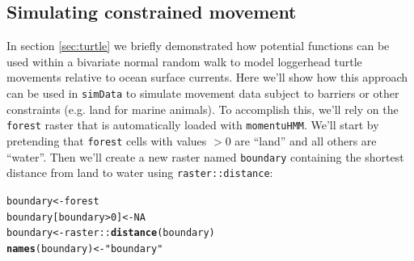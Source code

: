 \documentclass[12pt]{article}\usepackage[]{graphicx}\usepackage[]{xcolor}
\makeatletter
\newcommand{\hlnum}[1]{\textcolor[rgb]{0.686,0.059,0.569}{#1}}%
\newcommand{\hlsng}[1]{\textcolor[rgb]{0.192,0.494,0.8}{#1}}%
\newcommand{\hlopt}[1]{\textcolor[rgb]{0,0,0}{#1}}%
\newcommand{\hldef}[1]{\textcolor[rgb]{0.345,0.345,0.345}{#1}}%
\newcommand{\hlkwb}[1]{\textcolor[rgb]{0.69,0.353,0.396}{#1}}%
\newcommand{\hlkwd}[1]{\textcolor[rgb]{0.737,0.353,0.396}{\textbf{#1}}}%
\newenvironment{kframe}{%
 \def\at@end@of@kframe{}%
 \ifinner\ifhmode%
  \def\at@end@of@kframe{\end{minipage}}%
  \begin{minipage}{\columnwidth}%
 \fi\fi%
 \def\FrameCommand##1{\hskip\@totalleftmargin \hskip-\fboxsep
 \colorbox{shadecolor}{##1}\hskip-\fboxsep
     \hskip-\linewidth \hskip-\@totalleftmargin \hskip\columnwidth}%
 \MakeFramed {\advance\hsize-\width
   \@totalleftmargin\z@ \linewidth\hsize
   \@setminipage}}%
 {\par\unskip\endMakeFramed%
 \at@end@of@kframe}
\newenvironment{knitrout}{}{} %
\makeatother
\begin{document}
\subsection{Simulating constrained movement}
\label{sec:avoidLand}
In section \ref{sec:turtle} we briefly demonstrated how potential functions can be used within a bivariate normal random walk to model loggerhead turtle movements relative to ocean surface currents. Here we'll show how this approach can be used in \verb|simData| to simulate movement data subject to barriers or other constraints (e.g. land for marine animals). To accomplish this, we'll rely on the \verb|forest| raster that is automatically loaded with \verb|momentuHMM|. We'll start by pretending that \verb|forest| cells with values $>0$ are ``land'' and all others are ``water''.  Then we'll create a new raster named \verb|boundary| containing the shortest distance from land to water using \verb|raster::distance|:
\begin{knitrout}
\color{fgcolor}\begin{kframe}
\begin{alltt}
\hldef{boundary} \hlkwb{<-} \hldef{forest}
\hldef{boundary[boundary}\hlopt{>}\hlnum{0}\hldef{]} \hlkwb{<-} \hlnum{NA}
\hldef{boundary} \hlkwb{<-} \hldef{raster}\hlopt{::}\hlkwd{distance}\hldef{(boundary)}
\hlkwd{names}\hldef{(boundary)} \hlkwb{<-} \hlsng{"boundary"}
\end{alltt}
\end{kframe}
\end{knitrout}
\end{document}
